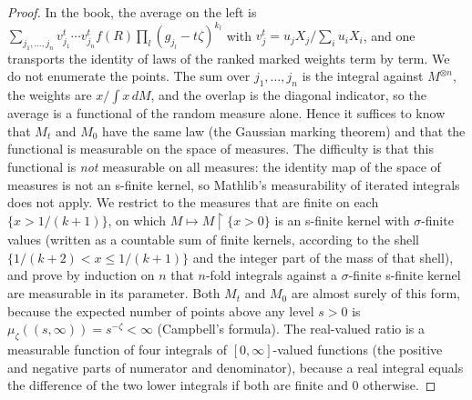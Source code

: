 \begin{proof}
  \leanok
{}
In the book, the average on the left is $\sum_{j_1,\dots,j_n}v^t_{j_1}\cdots v^t_{j_n}f(R)\prod_l(g_{j_l}-t\zeta)^{k_l}$ with $v^t_j=u_jX_j/\sum_iu_iX_i$, and one transports the identity of laws of the ranked marked weights term by term. We do not enumerate the points. The sum over $j_1,\dots,j_n$ is the integral against $M^{\otimes n}$, the weights are $x/\int x\,dM$, and the overlap is the diagonal indicator, so the average is a functional of the random measure alone. Hence it suffices to know that $M_t$ and $M_0$ have the same law (the Gaussian marking theorem) and that the functional is measurable on the space of measures. The difficulty is that this functional is \emph{not} measurable on all measures: the identity map of the space of measures is not an s-finite kernel, so Mathlib's measurability of iterated integrals does not apply. We restrict to the measures that are finite on each $\{x>1/(k+1)\}$, on which $M\mapsto M\!\restriction\!\{x>0\}$ is an s-finite kernel with $\sigma$-finite values (written as a countable sum of finite kernels, according to the shell $\{1/(k+2)<x\le1/(k+1)\}$ and the integer part of the mass of that shell), and prove by induction on $n$ that $n$-fold integrals against a $\sigma$-finite s-finite kernel are measurable in its parameter. Both $M_t$ and $M_0$ are almost surely of this form, because the expected number of points above any level $s>0$ is $\mu_\zeta((s,\infty))=s^{-\zeta}<\infty$ (Campbell's formula). The real-valued ratio is a measurable function of four integrals of $[0,\infty]$-valued functions (the positive and negative parts of numerator and denominator), because a real integral equals the difference of the two lower integrals if both are finite and $0$ otherwise.
\end{proof}


